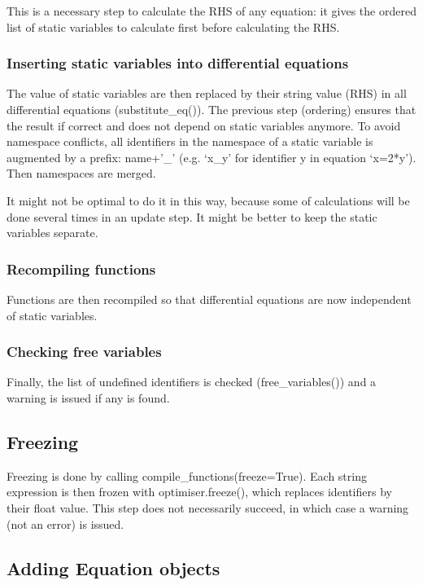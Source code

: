 \documentclass[letterpaper,10pt,english]{manual}
\begin{document}
This is a necessary step to calculate the RHS of any equation: it gives the ordered list of static variables
to calculate first before calculating the RHS.


\subsubsection{Inserting static variables into differential equations}

The value of static variables are then replaced by their string value (RHS) in all differential equations
(substitute\_eq()). The previous step (ordering) ensures that the result if correct and does not depend on
static variables anymore.
To avoid namespace conflicts, all identifiers in the namespace of a static variable is augmented by a
prefix: name+'\_' (e.g. `x\_y' for identifier y in equation `x=2*y'). Then namespaces are merged.

It might not be optimal to do it in this way, because some of calculations will be done several times in
an update step. It might be better to keep the static variables separate.


\subsubsection{Recompiling functions}

Functions are then recompiled so that differential equations are now independent of static variables.


\subsubsection{Checking free variables}

Finally, the list of undefined identifiers is checked (free\_variables()) and a warning is issued if
any is found.


\subsection{Freezing}

Freezing is done by calling compile\_functions(freeze=True). Each string expression is then frozen
with optimiser.freeze(), which replaces identifiers by their float value. This step does not necessarily
succeed, in which case a warning (not an error) is issued.


\subsection{Adding Equation objects}
\end{document}
